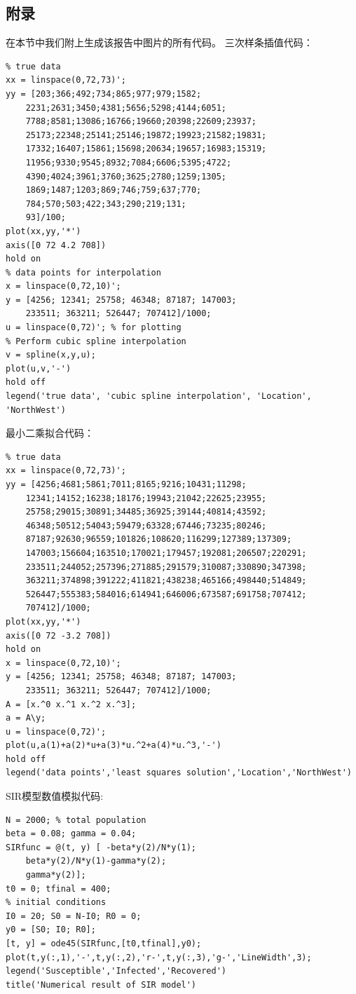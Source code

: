 \documentclass[a4paper]{article}
\begin{document}
\begin{CJK*}{UTF8}{gkai}
  \section{附录}
  在本节中我们附上生成该报告中图片的所有代码。
  三次样条插值代码：
\begin{verbatim}
% true data
xx = linspace(0,72,73)';
yy = [203;366;492;734;865;977;979;1582;
    2231;2631;3450;4381;5656;5298;4144;6051;
    7788;8581;13086;16766;19660;20398;22609;23937;
    25173;22348;25141;25146;19872;19923;21582;19831;
    17332;16407;15861;15698;20634;19657;16983;15319;
    11956;9330;9545;8932;7084;6606;5395;4722;
    4390;4024;3961;3760;3625;2780;1259;1305;
    1869;1487;1203;869;746;759;637;770;
    784;570;503;422;343;290;219;131;
    93]/100;
plot(xx,yy,'*')
axis([0 72 4.2 708])
hold on
% data points for interpolation
x = linspace(0,72,10)';
y = [4256; 12341; 25758; 46348; 87187; 147003;
    233511; 363211; 526447; 707412]/1000;
u = linspace(0,72)'; % for plotting
% Perform cubic spline interpolation
v = spline(x,y,u);
plot(u,v,'-')
hold off
legend('true data', 'cubic spline interpolation', 'Location', 'NorthWest')
\end{verbatim}
  最小二乘拟合代码：
\begin{verbatim}
% true data
xx = linspace(0,72,73)';
yy = [4256;4681;5861;7011;8165;9216;10431;11298;
    12341;14152;16238;18176;19943;21042;22625;23955;
    25758;29015;30891;34485;36925;39144;40814;43592;
    46348;50512;54043;59479;63328;67446;73235;80246;
    87187;92630;96559;101826;108620;116299;127389;137309;
    147003;156604;163510;170021;179457;192081;206507;220291;
    233511;244052;257396;271885;291579;310087;330890;347398;
    363211;374898;391222;411821;438238;465166;498440;514849;
    526447;555383;584016;614941;646006;673587;691758;707412;
    707412]/1000;
plot(xx,yy,'*')
axis([0 72 -3.2 708])
hold on
x = linspace(0,72,10)';
y = [4256; 12341; 25758; 46348; 87187; 147003;
    233511; 363211; 526447; 707412]/1000;
A = [x.^0 x.^1 x.^2 x.^3];
a = A\y;
u = linspace(0,72)';
plot(u,a(1)+a(2)*u+a(3)*u.^2+a(4)*u.^3,'-')
hold off
legend('data points','least squares solution','Location','NorthWest')
\end{verbatim}

  SIR模型数值模拟代码:
\begin{verbatim}
N = 2000; % total population
beta = 0.08; gamma = 0.04; 
SIRfunc = @(t, y) [ -beta*y(2)/N*y(1);
    beta*y(2)/N*y(1)-gamma*y(2);
    gamma*y(2)];
t0 = 0; tfinal = 400;
% initial conditions
I0 = 20; S0 = N-I0; R0 = 0;
y0 = [S0; I0; R0];
[t, y] = ode45(SIRfunc,[t0,tfinal],y0);
plot(t,y(:,1),'-',t,y(:,2),'r-',t,y(:,3),'g-','LineWidth',3);
legend('Susceptible','Infected','Recovered')
title('Numerical result of SIR model')
\end{verbatim}


\end{CJK*}
\end{document}
